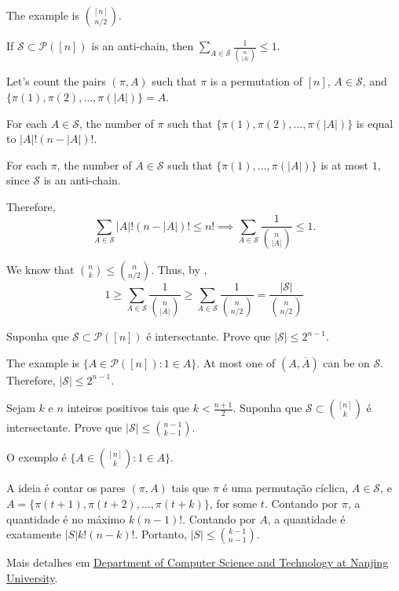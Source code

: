 \documentclass[10pt,a4paper]{article}
\begin{document}
\begin{sol}
	The example is $\binom{[n]}{n/2}$.

	\begin{lem}[LYMB, 1960's]\label{lem:lymb}
		If $\mathcal{S} \subset \mathcal P([n])$ is an anti-chain, then $\sum_{A \in \mathcal{S}} \frac{1}{\binom{n}{|A|}} \leq 1$.
	\end{lem}

	\begin{dem}
		Let's count the pairs $(\pi, A)$ such that $\pi$ is a permutation of $[n]$, $A \in \mathcal{S}$, and  $\{\pi(1), \pi(2), \dots, \pi(|A|)\} = A$.

		For each $A \in \mathcal{S}$, the number of $\pi$ such that $\{\pi(1), \pi(2), \dots, \pi(|A|)\}$ is equal to $|A|!(n - |A|)!$.

		For each $\pi$, the number of $A \in \mathcal{S}$ such that $\{\pi(1), \dots, \pi(|A|)\}$ is at most $1$, since $\mathcal{S}$ is an anti-chain.

		Therefore, \[
			\sum_{A \in \mathcal{S}} |A|!(n-|A|)! \le n!
			\implies
			\sum_{A \in \mathcal{S}} \frac{1}{\binom{n}{|A|}} \le 1.
		\]
	\end{dem}
	We know that $\binom{n}{k} \le \binom{n}{n/2}$. Thus, by , \[
		1 \ge \sum_{A\in \mathcal{S}} \frac{1}{\binom{n}{|A|}} \ge \sum_{A\in \mathcal{S}} \frac{1}{\binom{n}{n/2}} = \frac{|\mathcal{S}|}{\binom{n}{n/2}}
	\]
\end{sol}

\begin{prob}
	Suponha que $\mathcal{S} \subset \mathcal{P}([n])$ é intersectante. Prove que $|\mathcal{S}| \le 2^{n-1}$.
\end{prob}

\begin{sk}
	The example is $\{A \in \mathcal{P}([n]) : 1 \in A\}$.
	At most one of $(A, \overline{A})$ can be on $\mathcal{S}$. Therefore, $|\mathcal{S}| \le 2^{n-1}$.
\end{sk}

\begin{prob}
	Sejam $k$ e $n$ inteiros positivos tais que $k < \frac{n+1}{2}$.
	Suponha que $\mathcal{S} \subset \binom{[n]}{k}$ é intersectante. Prove que $|\mathcal{S}| \le \binom{n-1}{k-1}$.
\end{prob}

\begin{sk}
	O exemplo é $\{A \in \binom{[n]}{k} : 1 \in A\}$.

	A ideia é contar os pares $(\pi, A)$ tais que $\pi$ é uma permutação cíclica, $A \in \mathcal{S}$, e $A = \{\pi(t+1), \pi(t+2), \dots, \pi(t+k)\}$, for some $t$.
	Contando por $\pi$, a quantidade é no máximo $k (n-1)!$. Contando por $A$, a quantidade é exatamente $\left|S\right| k!(n-k)!$. Portanto, $|S| \leq \binom{k-1}{n-1}$.

	Mais detalhes em \href{http://tcs.nju.edu.cn/wiki/index.php/Combinatorics_(Fall_2010)/Extremal_set_theory#Katona.27s_proof}{Department of Computer Science and Technology at Nanjing University}.
\end{sk}
\end{document}
